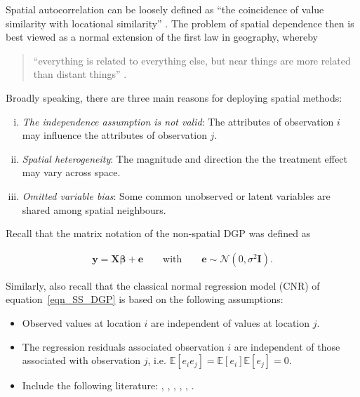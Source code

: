 Spatial autocorrelation can be loosely defined as ``the coincidence of value similarity with locational similarity'' \citep{Anselin2002}. The problem of spatial dependence then is best viewed as a normal extension of the first law in geography, whereby

\begin{quote}
``everything is related to everything else, but near things are more related than distant things'' \citep[p.236]{Tobler1970}.
\end{quote}

Broadly speaking, there are three main reasons for deploying spatial methods:

\begin{enumerate}[(i)]
\item \emph{The independence assumption is not valid}: The attributes of observation $i$ may influence the attributes of observation
$j$.
\item \emph{Spatial heterogeneity}: The magnitude and direction the the treatment effect may vary across space.
\item \emph{Omitted variable bias}: Some common unobserved or latent variables are shared among spatial neighbours.
\end{enumerate}


Recall that the matrix notation of the non-spatial DGP was defined as

\begin{eqnarray}
\boldsymbol{y} = \boldsymbol{X\beta} + \boldsymbol{e} \qquad \text{with} \qquad \boldsymbol{e}\sim\mathcal{N}(0,\sigma^{2}\boldsymbol{I}).\label{eqn_SS_DGP}
\end{eqnarray}

Similarly, also recall that the classical normal regression model (CNR) of equation~\ref{eqn_SS_DGP} is based on the following assumptions:

\begin{itemize}
\item Observed values at location $i$ are independent of values at location $j$.
\item The regression residuals associated observation $i$ are independent of those associated with observation $j$, i.e. $\mathbb{E}[e_{i}e_{j}]=\mathbb{E}[e_{i}]\mathbb{E}[e_{j}]=0$.
\end{itemize}

\begin{itemize}
\item Include the following literature: \citet{Bivand2008}, \citet{Bivand2008a}, \citet{Corrado2012}, \citet{Kelejian1998}, \citet{McMillen2010a}, \citet{Pinske2010}.
\end{itemize}




